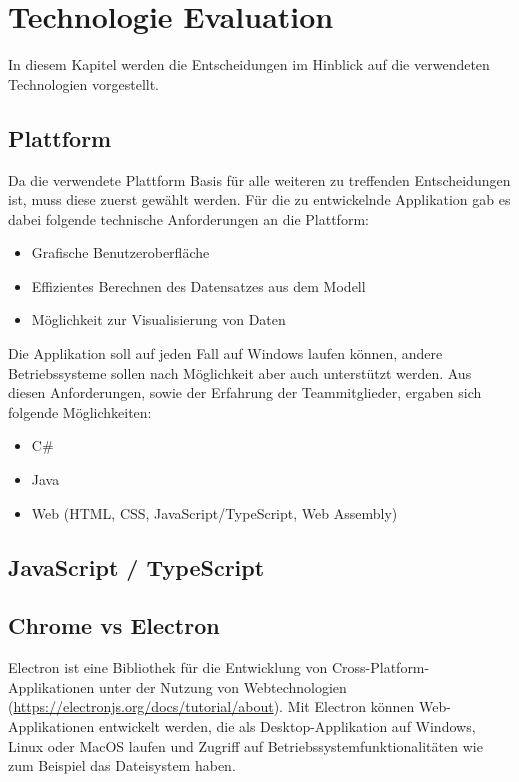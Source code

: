 
\chapter{Technologie Evaluation}

In diesem Kapitel werden die Entscheidungen im Hinblick auf die verwendeten Technologien vorgestellt.

\section{Plattform}

Da die verwendete Plattform Basis für alle weiteren zu treffenden Entscheidungen ist, muss diese zuerst gewählt werden. Für die zu entwickelnde Applikation gab es dabei folgende technische Anforderungen an die Plattform:

\begin{itemize}
    \item Grafische Benutzeroberfläche
    \item Effizientes Berechnen des Datensatzes aus dem Modell
    \item Möglichkeit zur Visualisierung von Daten
\end{itemize}

Die Applikation soll auf jeden Fall auf Windows laufen können, andere Betriebssysteme sollen nach Möglichkeit aber auch unterstützt werden. Aus diesen Anforderungen, sowie der Erfahrung der Teammitglieder, ergaben sich folgende Möglichkeiten:
\begin{itemize}
    \item C\#
    \item Java
    \item Web (HTML, CSS, JavaScript/TypeScript, Web Assembly)
\end{itemize}

\section{JavaScript / TypeScript}

\section{Chrome vs Electron}

Electron ist eine Bibliothek für die Entwicklung von Cross-Platform-Applikationen unter der Nutzung von Webtechnologien (\url{https://electronjs.org/docs/tutorial/about}). Mit Electron können Web-Applikationen entwickelt werden, die als Desktop-Applikation auf Windows, Linux oder MacOS laufen und Zugriff auf Betriebssystemfunktionalitäten wie zum Beispiel das Dateisystem haben.

